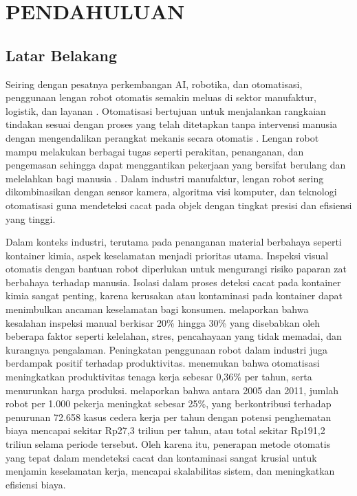 \chapter{PENDAHULUAN}
\section{Latar Belakang}
\noindent
Seiring dengan pesatnya perkembangan AI,
robotika, dan otomatisasi, penggunaan lengan robot otomatis semakin
meluas di sektor manufaktur, logistik, dan layanan \citep{1}. Otomatisasi
bertujuan untuk menjalankan rangkaian tindakan sesuai dengan proses
yang telah ditetapkan tanpa intervensi manusia dengan mengendalikan
perangkat mekanis secara otomatis \citep{2}. Lengan robot mampu
melakukan berbagai tugas seperti perakitan, penanganan, dan
pengemasan sehingga dapat menggantikan pekerjaan yang bersifat
berulang dan melelahkan bagi manusia \citep{3}. Dalam industri
manufaktur, lengan robot sering
dikombinasikan dengan sensor kamera, algoritma visi komputer, dan
teknologi otomatisasi guna mendeteksi cacat pada objek dengan tingkat
presisi dan efisiensi yang tinggi.

Dalam konteks industri, terutama pada penanganan material berbahaya
seperti kontainer kimia, aspek keselamatan menjadi prioritas utama.
Inspeksi visual otomatis dengan bantuan robot diperlukan untuk
mengurangi risiko paparan zat berbahaya terhadap manusia. Isolasi
dalam proses deteksi cacat pada kontainer kimia sangat
penting, karena kerusakan atau kontaminasi pada kontainer dapat
menimbulkan ancaman keselamatan bagi konsumen. \citet{4} melaporkan
bahwa kesalahan
inspeksi manual berkisar 20\% hingga 30\% yang disebabkan oleh
beberapa faktor seperti kelelahan,
stres, pencahayaan yang tidak memadai, dan kurangnya
pengalaman. Peningkatan penggunaan robot dalam industri juga
berdampak positif terhadap produktivitas. \citet{5} menemukan bahwa
otomatisasi meningkatkan produktivitas tenaga kerja sebesar 0,36\%
per tahun, serta menurunkan harga produksi. \citet{6}
melaporkan bahwa antara 2005 dan 2011, jumlah robot per 1.000
pekerja meningkat sebesar 25\%, yang berkontribusi terhadap penurunan
72.658 kasus cedera kerja per tahun dengan potensi penghematan biaya
mencapai sekitar Rp27,3 triliun per tahun, atau total sekitar Rp191,2
triliun selama periode tersebut. Oleh
karena itu, penerapan metode otomatis yang tepat dalam mendeteksi
cacat dan kontaminasi sangat krusial untuk menjamin keselamatan
kerja, mencapai skalabilitas sistem, dan meningkatkan efisiensi biaya.

